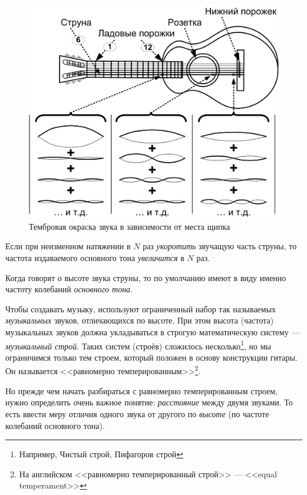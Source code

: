 \begin{Example}
    \begin{figure}[!ht]
        \centering
        \includegraphics{fig/obertone-color} 
        \caption{Тембровая окраска звука в зависимости от места щипка}\label{fig:music:tone:obertone-color}
    \end{figure} 
\end{Example}


\begin{Definition}
    Если при неизменном натяжении в $N$ раз \emph{укоротить} звучащую часть струны, то частота издаваемого основного тона \emph{увеличится} в $N$ раз.
\end{Definition}

Когда говорят о высоте звука струны, то по умолчанию имеют в виду именно частоту колебаний \emph{основного тона}.

Чтобы создавать музыку, используют ограниченный набор так называемых \emph{музыкальных} звуков, отличающихся по высоте. При этом высота (частота) музыкальных звуков должна укладываться в строгую математическую систему --- \emph{музыкальный строй}. Таких систем (строёв) сложилось несколько\footnote{Например, Чистый строй, Пифагоров строй}, но мы ограничимся только тем строем, который положен в основу конструкции гитары. Он называется <<равномерно темперированным>>\footnote{На английском <<равномерно темперированный строй>> --- <<equal temperament>>}.

Но прежде чем начать разбираться с равномерно темперированным строем, нужно определить очень важное понятие: \emph{расстояние} между двумя звуками. То есть ввести меру отличия одного звука от другого по \emph{высоте} (по частоте колебаний основного тона). 

